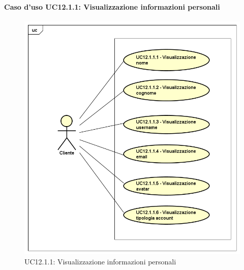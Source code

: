 \newpage
\paragraph{Caso d'uso UC12.1.1: Visualizzazione informazioni personali}
\label{UC12_1_1}
\begin{figure}[ht]
	\centering
	\includegraphics[scale=0.45]{UML/UC12_1_1.png}
	\caption{UC12.1.1: Visualizzazione informazioni personali}
\end{figure}

